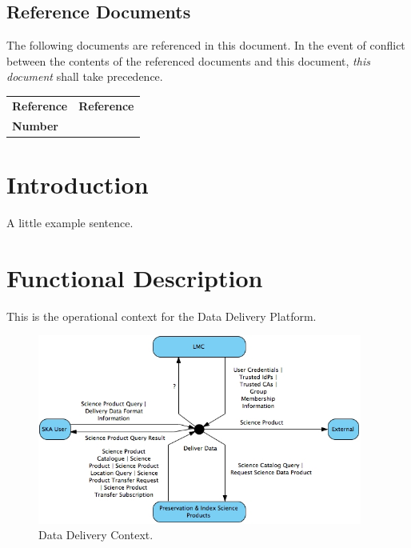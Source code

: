 \documentclass[11pt,a4paper]{article}
\begin{document}
\subsection*{Reference Documents}

The following documents are referenced in this document. In the event of
conflict between the contents of the referenced documents and this document,
\emph{this document} shall take precedence.

\begin{center}{
\begin{tabularx}{\textwidth}{|X|X|}
    \hline
    \bf{Reference} & \bf{Reference}\\
    \bf{Number} & \\
    \hline
\end{tabularx}}
\end{center}




\newpage
\section{Introduction}

A little example sentence.

\clearpage
\section{Functional Description}
\label{section:main}

This is the operational context for the Data Delivery Platform.

\begin{figure}[h]
  \centering
  \includegraphics[width=0.95\textwidth]{L0.jpg}
  \caption{Data Delivery Context.}
\end{figure}
\end{document}
